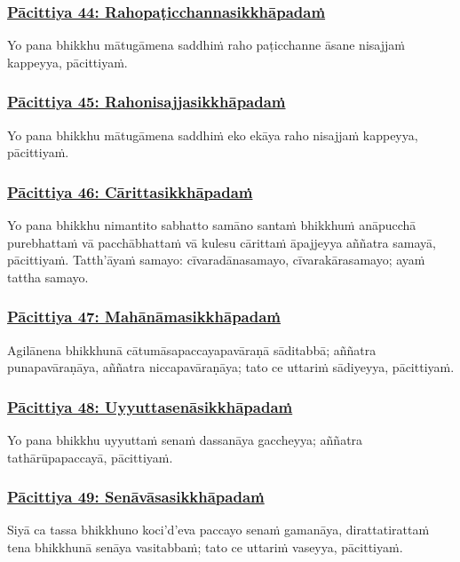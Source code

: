 \subsubsection*{\hyperref[exp44]{Pācittiya 44: Rahopaṭicchannasikkhāpadaṁ}}
\label{pac44}
Yo pana bhikkhu mātugāmena saddhiṁ raho paṭicchanne āsane nisajjaṁ kappeyya, pācittiyaṁ.

\subsubsection*{\hyperref[exp45]{Pācittiya 45: Rahonisajjasikkhāpadaṁ}}
\label{pac45}
Yo pana bhikkhu mātugāmena saddhiṁ eko ekāya raho nisajjaṁ kappeyya, pācittiyaṁ.

\subsubsection*{\hyperref[exp46]{Pācittiya 46: Cārittasikkhāpadaṁ}}
\label{pac46}
Yo pana bhikkhu nimantito sabhatto samāno santaṁ bhikkhuṁ anāpucchā purebhattaṁ vā pacchābhattaṁ vā kulesu cārittaṁ āpajjeyya aññatra samayā, pācittiyaṁ. Tatth'āyaṁ samayo: cīvaradānasamayo, cīvarakārasamayo; ayaṁ tattha samayo.

\subsubsection*{\hyperref[exp47]{Pācittiya 47: Mahānāmasikkhāpadaṁ}}
\label{pac47}
Agilānena bhikkhunā cātumāsapaccayapavāraṇā sāditabbā; aññatra punapavāraṇāya, aññatra niccapavāraṇāya; tato ce uttariṁ sādiyeyya, pācittiyaṁ.

\subsubsection*{\hyperref[exp48]{Pācittiya 48: Uyyuttasenāsikkhāpadaṁ}}
\label{pac48}
Yo pana bhikkhu uyyuttaṁ senaṁ dassanāya gaccheyya; aññatra tathārūpapaccayā, pācittiyaṁ.

\subsubsection*{\hyperref[exp49]{Pācittiya 49: Senāvāsasikkhāpadaṁ}}
\label{pac49}
Siyā ca tassa bhikkhuno koci'd'eva paccayo senaṁ gamanāya, dirattatirattaṁ tena bhikkhunā senāya vasitabbaṁ; tato ce uttariṁ vaseyya, pācittiyaṁ.

